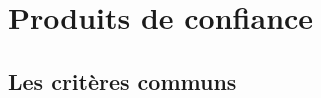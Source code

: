 
\section{Produits de confiance}

\subsection{Les critères communs} 

\label{chap:ISOCC}

\utodo

\utocomplete

